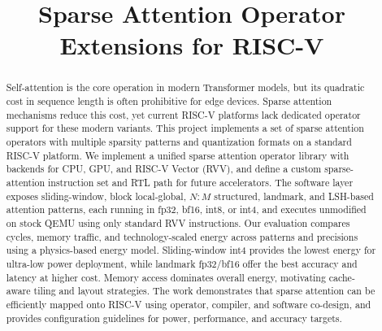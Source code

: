 \documentclass[10pt,conference]{IEEEtran}
\begin{document}
\title{Sparse Attention Operator Extensions for RISC-V}

\author{
}

\maketitle

\begin{abstract}
Self-attention is the core operation in modern Transformer models, but its quadratic cost in sequence length is often prohibitive for edge devices. Sparse attention mechanisms reduce this cost, yet current RISC-V platforms lack dedicated operator support for these modern variants. This project implements a set of sparse attention operators with multiple sparsity patterns and quantization formats on a standard RISC-V platform.
We implement a unified sparse attention operator library with backends for CPU, GPU, and RISC-V Vector (RVV), and define a custom sparse-attention instruction set and RTL path for future accelerators. The software layer exposes sliding-window, block local-global, $N\!:\!M$ structured, landmark, and LSH-based attention patterns, each running in fp32, bf16, int8, or int4, and executes unmodified on stock QEMU using only standard RVV instructions.
Our evaluation compares cycles, memory traffic, and technology-scaled energy across patterns and precisions using a physics-based energy model. Sliding-window int4 provides the lowest energy for ultra-low power deployment, while landmark fp32/bf16 offer the best accuracy and latency at higher cost. Memory access dominates overall energy, motivating cache-aware tiling and layout strategies. The work demonstrates that sparse attention can be efficiently mapped onto RISC-V using operator, compiler, and software co-design, and provides configuration guidelines for power, performance, and accuracy targets.
\end{abstract}
\end{document}
